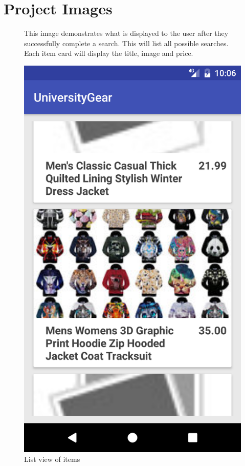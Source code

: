 \documentclass[journal,compsoc, 10pt, draftclsnofoot, onecolumn]{IEEEtran}
\begin{document}
\section{Project Images}
\begin{figure}[h]
This image demonstrates what is displayed to the user after they successfully 
complete a search. This will list all possible searches. Each item card will display 
the title, image and price. 
\centering
\caption{List view of items}
\includegraphics[scale=.2]{listview}
\end{figure}
\end{document}
